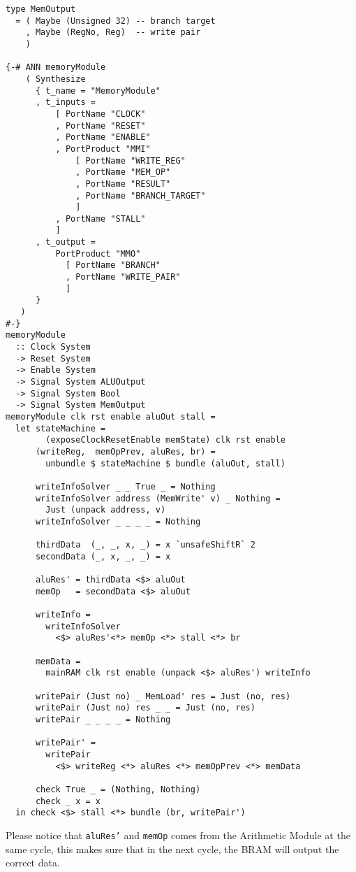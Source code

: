 \begin{verbatim}
type MemOutput
  = ( Maybe (Unsigned 32) -- branch target
    , Maybe (RegNo, Reg)  -- write pair
    )

{-# ANN memoryModule
    ( Synthesize
      { t_name = "MemoryModule"
      , t_inputs =
          [ PortName "CLOCK"
          , PortName "RESET"
          , PortName "ENABLE"
          , PortProduct "MMI"
              [ PortName "WRITE_REG"
              , PortName "MEM_OP"
              , PortName "RESULT"
              , PortName "BRANCH_TARGET"
              ]
          , PortName "STALL"
          ]
      , t_output =
          PortProduct "MMO" 
            [ PortName "BRANCH"
            , PortName "WRITE_PAIR"
            ]
      }
   )
#-}
memoryModule 
  :: Clock System
  -> Reset System
  -> Enable System
  -> Signal System ALUOutput
  -> Signal System Bool
  -> Signal System MemOutput
memoryModule clk rst enable aluOut stall =
  let stateMachine = 
        (exposeClockResetEnable memState) clk rst enable
      (writeReg,  memOpPrev, aluRes, br) =
        unbundle $ stateMachine $ bundle (aluOut, stall)

      writeInfoSolver _ _ True _ = Nothing
      writeInfoSolver address (MemWrite' v) _ Nothing = 
        Just (unpack address, v)
      writeInfoSolver _ _ _ _ = Nothing

      thirdData  (_, _, x, _) = x `unsafeShiftR` 2
      secondData (_, x, _, _) = x

      aluRes' = thirdData <$> aluOut
      memOp   = secondData <$> aluOut

      writeInfo = 
        writeInfoSolver 
          <$> aluRes'<*> memOp <*> stall <*> br

      memData = 
        mainRAM clk rst enable (unpack <$> aluRes') writeInfo

      writePair (Just no) _ MemLoad' res = Just (no, res)
      writePair (Just no) res _ _ = Just (no, res)
      writePair _ _ _ _ = Nothing

      writePair' = 
        writePair 
          <$> writeReg <*> aluRes <*> memOpPrev <*> memData

      check True _ = (Nothing, Nothing)
      check _ x = x
  in check <$> stall <*> bundle (br, writePair')
\end{verbatim}
Please notice that \texttt{aluRes'} and \texttt{memOp} comes from the Arithmetic Module at the same cycle, this makes sure that in the next cycle, the BRAM will output the correct data.

